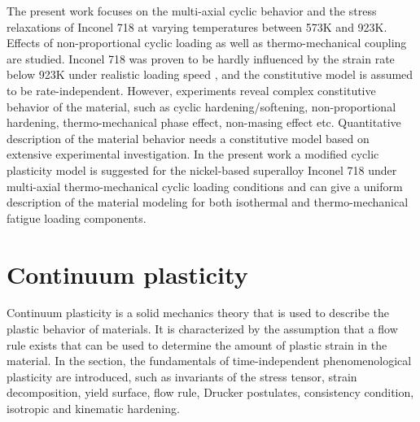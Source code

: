 The present work focuses on the multi-axial cyclic behavior and the stress relaxations of Inconel 718 at varying temperatures between 573K and 923K. Effects of non-proportional cyclic loading as well as thermo-mechanical coupling are studied. Inconel 718 was proven to be hardly influenced by the strain rate below 923K under realistic loading speed \cite{kim1988elevated, Schlesinger2017}, and the constitutive model is assumed to be rate-independent. However,  experiments reveal complex constitutive behavior of the material, such as cyclic hardening/softening, non-proportional hardening, thermo-mechanical phase effect, non-masing effect etc. Quantitative description of the material behavior needs a constitutive model based on extensive experimental investigation. In the present work a modified cyclic plasticity model is suggested for the nickel-based superalloy Inconel 718 under multi-axial thermo-mechanical cyclic loading conditions and can give a uniform description of the material modeling for both isothermal and thermo-mechanical fatigue loading components.

\section{Continuum plasticity}
\noindent
Continuum plasticity is a solid mechanics theory that is used to describe the plastic behavior of materials.
It is characterized by the assumption that a flow rule exists that can be used to determine the amount of plastic strain in the material.
In the section, the fundamentals of time-independent phenomenological plasticity are introduced, such as invariants of the stress tensor, strain decomposition, yield surface, flow rule, Drucker postulates, consistency condition, isotropic and kinematic hardening.

